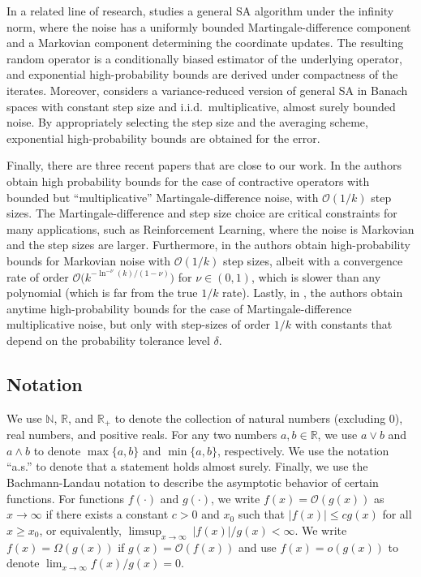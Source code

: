 \documentclass{article}
\newcommand{\R}{\mathbb{R}}
\newcommand{\N}{\mathbb{N}}
\begin{document}
In a related line of research, \citet{qu2020finite} studies a general SA algorithm under the infinity norm, where the noise has a uniformly bounded Martingale-difference component and a Markovian component determining the coordinate updates. The resulting random operator is a conditionally biased estimator of the underlying operator, and exponential high-probability bounds are derived under compactness of the iterates. Moreover, \citet{infiniteDim22} considers a variance-reduced version of general SA in Banach spaces with constant step size and i.i.d.\ multiplicative, almost surely bounded noise. By appropriately selecting the step size and the averaging scheme, exponential high-probability bounds are obtained for the error.


Finally, there are three recent papers that are close to our work. In \cite{chen2025concentration} the authors obtain high probability bounds for the case of contractive operators with bounded but ``multiplicative'' Martingale-difference noise, with $\mathcal{O}(1/k)$ step sizes. The Martingale-difference and step size choice are critical constraints for many applications, such as Reinforcement Learning, where the noise is Markovian and the step sizes are larger. Furthermore, in \cite{qian2024almost} the authors obtain high-probability bounds for Markovian noise with $\mathcal{O}(1/k)$ step sizes, albeit with a convergence rate of order $\mathcal{O}\Big(k^{-\ln^{-\nu}(k)/(1-\nu)}\Big)$ for $\nu\in(0,1)$, which is slower than any polynomial (which is far from the true $1/k$ rate). Lastly, in \cite{pham2025time}, the authors obtain anytime high-probability bounds for the case of Martingale-difference multiplicative noise, but only with step-sizes of order $1/k$ with constants that depend on the probability tolerance level $\delta$.



\subsection{Notation}

We use $\N$, $\R$, and $\R_+$ to denote the collection of natural numbers (excluding $0$), real numbers, and positive reals. For any two numbers $a, b \in \R$, we use $a\vee b$ and $a \wedge b$ to denote $\max\{a,b\}$ and $\min\{a,b\}$, respectively. We use the notation ``a.s.'' to denote that a statement holds almost surely. Finally, we use the Bachmann-Landau notation to describe the asymptotic behavior of certain functions. For functions $f(\cdot)$ and $g(\cdot)$, we write $f(x) = \mathcal{O}(g(x))$ as $x\rightarrow \infty$ if there exists a constant $c > 0$ and $x_0$ such that $|f(x)| \le c g(x)$ for all $x \ge x_0$, or equivalently, $\limsup\nolimits_{x\rightarrow\infty}~{|f(x)|}/{g(x)} < \infty$. We write $f(x) = \Omega(g(x))$ if $g(x) =\mathcal{O}(f(x))$ and use $f(x) = o(g(x))$ to denote $\lim\nolimits_{x\rightarrow\infty} f(x)/g(x) = 0$.
\end{document}
